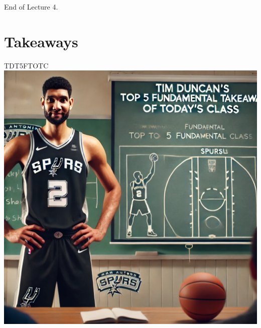 \documentclass[aspectratio=169]{beamer}
\begin{document}

\begin{frame}{}
    \centering
    \Huge End of Lecture 4.
\end{frame}

\section*{Takeaways}

\begin{frame}{TDT5FTOTC}
    \centering
    \includegraphics[height=0.9\textheight]{figures/tim.png}
\end{frame}
\end{document}
